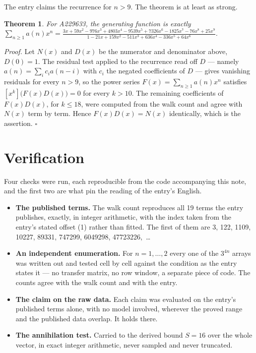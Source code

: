 \documentclass[11pt]{article}
\newtheorem{theorem}{Theorem}
\theoremstyle{definition}
\begin{document}
The entry claims the recurrence for $n > 9$. The theorem is at least as strong.

\begin{theorem} For A229633, the generating function is exactly $\sum_{n\ge 1} a(n)x^n = \frac{3x + 59x^{2} - 976x^{3} + 4803x^{4} - 9539x^{5} + 7326x^{6} - 1825x^{7} - 76x^{8} + 25x^{9}}{1 - 21x + 159x^{2} - 511x^{3} + 636x^{4} - 336x^{5} + 64x^{6}}$.\end{theorem}

{\itshape Proof.} Let $N(x)$ and $D(x)$ be the numerator and denominator above, $D(0)=1$. The residual test applied to the recurrence read off $D$ --- namely $a(n) = \sum_i c_i a(n-i)$ with $c_i$ the negated coefficients of $D$ --- gives vanishing residuals for every $n > 9$, so the power series $F(x)=\sum_{n\ge 1}a(n)x^n$ satisfies $[x^k]\bigl(F(x)D(x)\bigr) = 0$ for every $k > 10$. The remaining coefficients of $F(x)D(x)$, for $k \le 18$, were computed from the walk count and agree with $N(x)$ term by term. Hence $F(x)D(x) = N(x)$ identically, which is the assertion. $\square$

\section{Verification}

Four checks were run, each reproducible from the code accompanying this note, and the first two are what pin the reading of the entry's English.

\begin{itemize}

\item {\bfseries The published terms.} The walk count reproduces all 19 terms the entry publishes, exactly, in integer arithmetic, with the index taken from the entry's stated offset (1) rather than fitted. The first of them are 3, 122, 1109, 10227, 89331, 747299, 6049298, 47723226,~\dots

\item {\bfseries An independent enumeration.} For $n = 1,\dots,2$ every one of the $3^{4n}$ arrays was written out and tested cell by cell against the condition as the entry states it --- no transfer matrix, no row window, a separate piece of code. The counts agree with the walk count and with the entry.

\item {\bfseries The claim on the raw data.} Each claim was evaluated on the entry's published terms alone, with no model involved, wherever the proved range and the published data overlap. It holds there.

\item {\bfseries The annihilation test.} Carried to the derived bound $S = 16$ over the whole vector, in exact integer arithmetic, never sampled and never truncated.

\end{itemize}
\end{document}
